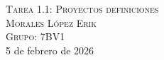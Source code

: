 \begin{titlepage}
\begin{minipage}[c][0.75\textheight][t]{0.75\textwidth}
\begin{center}
            {\LARGE\scshape Tarea 1.1: Proyectos definiciones}\\[2cm]

            {\large\textsc{Morales López Erik}}\\[1.2cm]

            {\large\scshape Grupo: 7BV1}\\[1.5cm]

            {\large 5 de febrero de 2026}
        \end{center}
    \end{minipage}

\end{titlepage}
